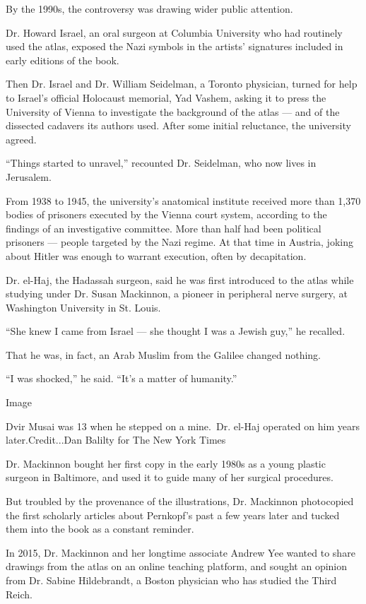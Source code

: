 By the 1990s, the controversy was drawing wider public attention.

Dr. Howard Israel, an oral surgeon at Columbia University who had
routinely used the atlas, exposed the Nazi symbols in the artists'
signatures included in early editions of the book.

Then Dr. Israel and Dr. William Seidelman, a Toronto physician, turned
for help to Israel's official Holocaust memorial, Yad Vashem, asking it
to press the University of Vienna to investigate the background of the
atlas --- and of the dissected cadavers its authors used. After some
initial reluctance, the university agreed.

``Things started to unravel,'' recounted Dr. Seidelman, who now lives in
Jerusalem.

From 1938 to 1945, the university's anatomical institute received more
than 1,370 bodies of prisoners executed by the Vienna court system,
according to the findings of an investigative committee. More than half
had been political prisoners --- people targeted by the Nazi regime. At
that time in Austria, joking about Hitler was enough to warrant
execution, often by decapitation.

Dr. el-Haj, the Hadassah surgeon, said he was first introduced to the
atlas while studying under Dr. Susan Mackinnon, a pioneer in peripheral
nerve surgery, at Washington University in St. Louis.

``She knew I came from Israel --- she thought I was a Jewish guy,'' he
recalled.

That he was, in fact, an Arab Muslim from the Galilee changed nothing.

``I was shocked,'' he said. ``It's a matter of humanity.''

Image

Dvir Musai was 13 when he stepped on a mine.~Dr. el-Haj operated on him
years later.Credit...Dan Balilty for The New York Times

Dr. Mackinnon bought her first copy in the early 1980s as a young
plastic surgeon in Baltimore, and used it to guide many of her surgical
procedures.

But troubled by the provenance of the illustrations, Dr. Mackinnon
photocopied the first scholarly articles about Pernkopf's past a few
years later and tucked them into the book as a constant reminder.

In 2015, Dr. Mackinnon and her longtime associate Andrew Yee wanted to
share drawings from the atlas on an online teaching platform, and sought
an opinion from Dr. Sabine Hildebrandt, a Boston physician who has
studied the Third Reich.

